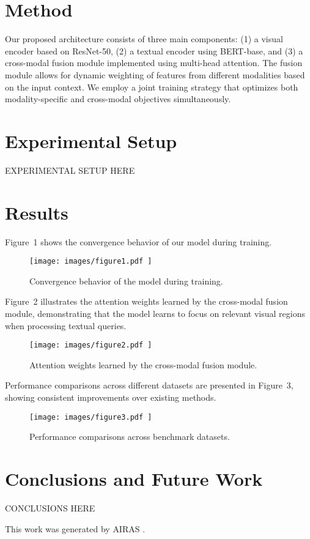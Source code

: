 \documentclass{article} %
\begin{document}
\section{Method}
\label{sec:method}
Our proposed architecture consists of three main components: (1) a visual encoder based on ResNet-50, (2) a textual encoder using BERT-base, and (3) a cross-modal fusion module implemented using multi-head attention. The fusion module allows for dynamic weighting of features from different modalities based on the input context. We employ a joint training strategy that optimizes both modality-specific and cross-modal objectives simultaneously.

\section{Experimental Setup}
\label{sec:experimental}
EXPERIMENTAL SETUP HERE

\section{Results}
\label{sec:results}
Figure~1 shows the convergence behavior of our model during training.

\begin{figure}[H]
\centering
\texttt{[image:  images/figure1.pdf ]}
\caption{Convergence behavior of the model during training.}
\end{figure}

Figure~2 illustrates the attention weights learned by the cross-modal fusion module, demonstrating that the model learns to focus on relevant visual regions when processing textual queries.

\begin{figure}[H]
\centering
\texttt{[image:  images/figure2.pdf ]}
\caption{Attention weights learned by the cross-modal fusion module.}
\end{figure}

Performance comparisons across different datasets are presented in Figure~3, showing consistent improvements over existing methods.

\begin{figure}[H]
\centering
\texttt{[image:  images/figure3.pdf ]}
\caption{Performance comparisons across benchmark datasets.}
\end{figure}

\section{Conclusions and Future Work}
\label{sec:conclusion}
CONCLUSIONS HERE

This work was generated by \textsc{AIRAS} \citep{airas2025}.



\end{document}
